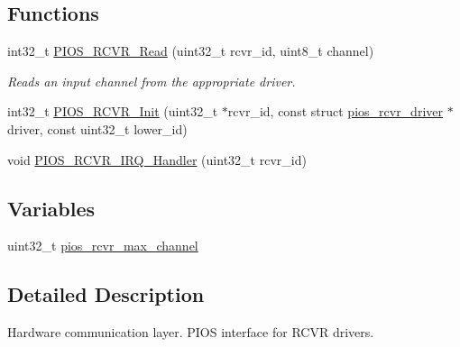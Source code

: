 \subsection*{\-Functions}
\begin{DoxyCompactItemize}
\item 
int32\-\_\-t \hyperlink{group___p_i_o_s___r_c_v_r_ga91b274787094f69d6f10c29de5bac5cc}{\-P\-I\-O\-S\-\_\-\-R\-C\-V\-R\-\_\-\-Read} (uint32\-\_\-t rcvr\-\_\-id, uint8\-\_\-t channel)
\begin{DoxyCompactList}\small\item\em \-Reads an input channel from the appropriate driver. \end{DoxyCompactList}\item 
int32\-\_\-t \hyperlink{group___p_i_o_s___r_c_v_r_gaafd8582e763d23ca96b4eef942078811}{\-P\-I\-O\-S\-\_\-\-R\-C\-V\-R\-\_\-\-Init} (uint32\-\_\-t $\ast$rcvr\-\_\-id, const struct \hyperlink{structpios__rcvr__driver}{pios\-\_\-rcvr\-\_\-driver} $\ast$driver, const uint32\-\_\-t lower\-\_\-id)
\item 
void \hyperlink{group___p_i_o_s___r_c_v_r_gaeb2454aa08c09917c456efe2919ee5e3}{\-P\-I\-O\-S\-\_\-\-R\-C\-V\-R\-\_\-\-I\-R\-Q\-\_\-\-Handler} (uint32\-\_\-t rcvr\-\_\-id)
\end{DoxyCompactItemize}
\subsection*{\-Variables}
\begin{DoxyCompactItemize}
\item 
uint32\-\_\-t \hyperlink{group___p_i_o_s___r_c_v_r_gafc878e038b0988e158d4bf4c2810faa1}{pios\-\_\-rcvr\-\_\-max\-\_\-channel}
\end{DoxyCompactItemize}


\subsection{\-Detailed \-Description}
\-Hardware communication layer. \-P\-I\-O\-S interface for \-R\-C\-V\-R drivers. 

